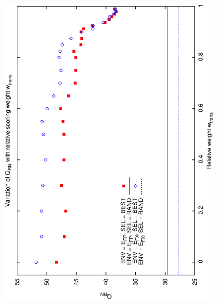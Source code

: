 \begin{figure}[h]
\begin{center}
{    \includegraphics[scale=0.25, angle=-90]{figures/cs1_dw1a2_rn.eps}
     \label{fig:cs1_dw1a2_rn}
  }
\end{center}
\end{figure}
